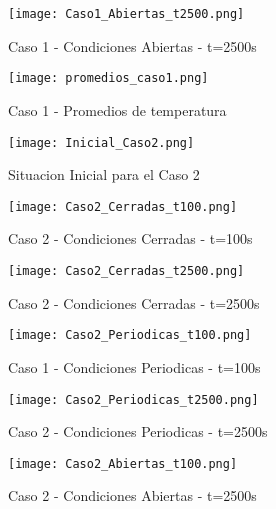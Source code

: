 \documentclass[12pt]{article}
\begin{document}
\begin{figure}[h]
\begin{center}
\texttt{[image: Caso1\_Abiertas\_t2500.png]}
\end{center}
\caption{Caso 1 - Condiciones Abiertas - t=2500s}
\end{figure}

\begin{figure}[h]
\begin{center}
\texttt{[image: promedios\_caso1.png]}
\end{center}
\caption{Caso 1 - Promedios de temperatura}
\end{figure}

\begin{figure}[h]
\begin{center}
\texttt{[image: Inicial\_Caso2.png]}
\end{center}
\caption{Situacion Inicial para el Caso 2}
\end{figure}


\begin{figure}[h]
\begin{center}
\texttt{[image: Caso2\_Cerradas\_t100.png]}
\end{center}
\caption{Caso 2 - Condiciones Cerradas - t=100s}
\end{figure}

\begin{figure}[h]
\begin{center}
\texttt{[image: Caso2\_Cerradas\_t2500.png]}
\end{center}
\caption{Caso 2 - Condiciones Cerradas - t=2500s}
\end{figure}

\begin{figure}[h]
\begin{center}
\texttt{[image: Caso2\_Periodicas\_t100.png]}
\end{center}
\caption{Caso 1 - Condiciones Periodicas - t=100s}
\end{figure}

\begin{figure}[h]
\begin{center}
\texttt{[image: Caso2\_Periodicas\_t2500.png]}
\end{center}
\caption{Caso 2 - Condiciones Periodicas - t=2500s}
\end{figure}

\begin{figure}[h]
\begin{center}
\texttt{[image: Caso2\_Abiertas\_t100.png]}
\end{center}
\caption{Caso 2 - Condiciones Abiertas - t=2500s}
\end{figure}
\end{document}
